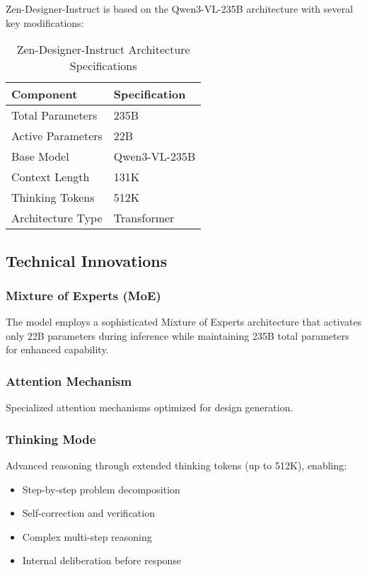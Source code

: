 \documentclass[11pt,a4paper]{article}
\begin{document}
Zen-Designer-Instruct is based on the Qwen3-VL-235B architecture with several key modifications:

\begin{table}[H]
\centering
\begin{tabular}{ll}
\toprule
\textbf{Component} & \textbf{Specification} \\
\midrule
Total Parameters & 235B \\
Active Parameters & 22B \\
Base Model & Qwen3-VL-235B \\
Context Length & 131K \\
Thinking Tokens & 512K \\


Architecture Type & Transformer \\
\bottomrule
\end{tabular}
\caption{Zen-Designer-Instruct Architecture Specifications}
\end{table}

\subsection{Technical Innovations}

\subsubsection{Mixture of Experts (MoE)}
The model employs a sophisticated Mixture of Experts architecture that activates only 22B parameters 
during inference while maintaining 235B total parameters for enhanced capability.

\subsubsection{Attention Mechanism}
Specialized attention mechanisms optimized for design generation.

\subsubsection{Thinking Mode}
Advanced reasoning through extended thinking tokens (up to 512K), enabling:
\begin{itemize}
    \item Step-by-step problem decomposition
    \item Self-correction and verification
    \item Complex multi-step reasoning
    \item Internal deliberation before response
\end{itemize}
\end{document}
